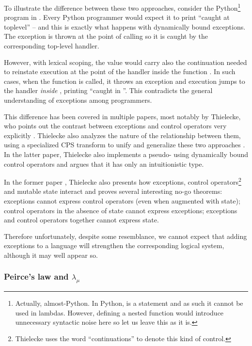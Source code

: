 To illustrate the difference between these two approaches, consider the
Python\footnote{Actually, almost-Python. In Python,
 is a statement and as such it cannot be used in lambdas. However, defining
a nested function would introduce unnecessary syntactic noise here so let us leave this as it is.}
program in . Every Python programmer would expect it to print
``caught at toplevel'' -- and this is exactly what happens with dynamically bound exceptions.
The exception is thrown at the point of calling  so it is caught by the corresponding
top-level handler.

However, with lexical scoping, the value  would carry also the continuation needed
to reinstate execution at the point of the handler inside the function . In such cases,
when the function  is called, it throws an exception and execution jumps to the handler
\emph{inside }, printing ``caught in ''. This contradicts the general
understanding of exceptions among programmers.

This difference has been covered in multiple papers, most notably by Thielecke, who
points out the contrast between exceptions and control operators very explicitly
\cite{thielecke:contrast}. Thielecke also analyzes the nature of the relationship between
them, using a specialized CPS transform to unify and generalize these two approaches
\cite{thielecke01}. In the latter paper, Thielecke also implements a pseudo-
using dynamically bound control operators and argues that it has only an intuitionistic type.

In the former paper \cite{thielecke:contrast}, Thielecke also presents how exceptions,
control operators\footnote{Thielecke uses the word ``continuations'' to denote this kind
of control.} and mutable state interact and proves several interesting no-go theorems:
exceptions cannot express control operators (even when augmented with state); control
operators in the absence of state cannot express exceptions; exceptions and control operators
together cannot express state.

Therefore unfortunately, despite some resemblance, we cannot expect that adding exceptions
to a language will strengthen the corresponding logical system, although it may well appear so.

\subsubsection{Peirce's law and $\lambda_\mu$}

